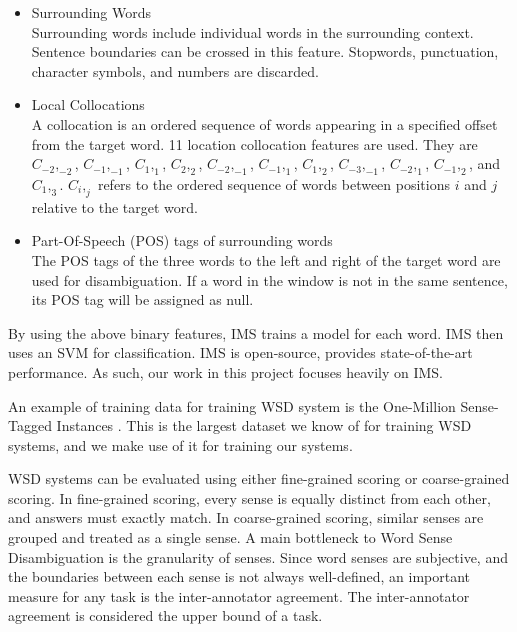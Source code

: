 \documentclass[11pt]{article}
\begin{document}
\begin{itemize}
	
	\item  Surrounding Words\\
	Surrounding words include individual words in the surrounding context. Sentence boundaries can be crossed in this feature. Stopwords, punctuation, character symbols, and numbers are discarded. 
	
	\item Local Collocations\\
	A collocation is an ordered sequence of words appearing in a specified offset from the target word. 11 location collocation features are used. They are $C_{-2},_{-2}$, $C_{-1},_{-1}$,
	$C_{1},_{1}$, $C_{2},_{2}$, $C_{-2},_{-1}$, $C_{-1},_{1}$, $C_{1},_{2}$, $C_{-3},_{-1}$,
	$C_{-2},_{1}$, $C_{-1},_{2}$, and $C_{1},_{3}$. $C_{i},_{j}$ refers to the ordered sequence of words between positions $i$ and $j$ relative to the target word. 
	
	\item Part-Of-Speech (POS) tags of surrounding words\\
	The POS tags of the three words to the left and right of the target word are used for disambiguation. If a word in the window is not in the same sentence, its POS tag will be assigned as null. %
\end{itemize} 

By using the above binary features, IMS trains a model for each word. IMS then uses an SVM for classification. IMS is open-source, provides state-of-the-art performance. As such, our work in this project focuses heavily on IMS. 

An example of training data for training WSD system is the One-Million Sense-Tagged Instances \cite{taghipour2015one}. This is the largest dataset we know of for training WSD systems, and we make use of it for training our systems. 

WSD systems can be evaluated using either fine-grained scoring or coarse-grained scoring. In fine-grained scoring, every sense is equally distinct from each other, and answers must exactly match. In coarse-grained scoring, similar senses are grouped and treated as a single sense. A main bottleneck to Word Sense Disambiguation is the granularity of senses. Since word senses are subjective, and the boundaries between each sense is not always well-defined, an important measure for any task is the inter-annotator agreement. The inter-annotator agreement is considered the upper bound of a task. 
\end{document}
